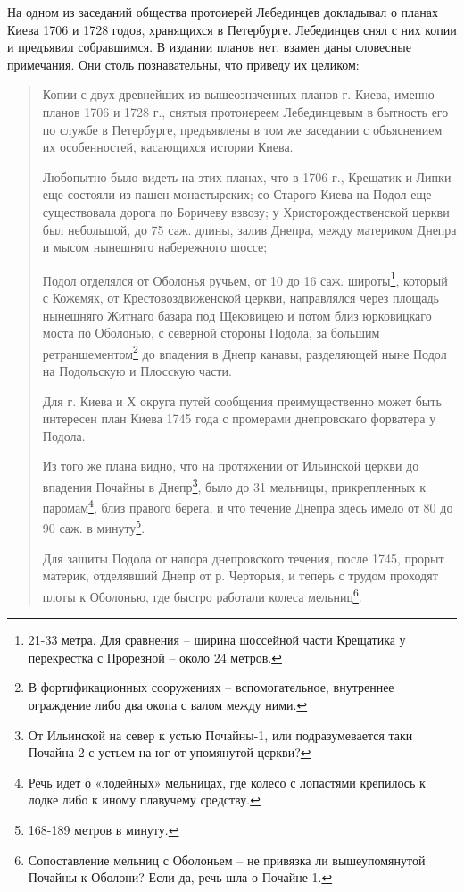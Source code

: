 На одном из заседаний общества протоиерей Лебединцев докладывал о планах Киева 1706 и 1728 годов, хранящихся в Петербурге. Лебединцев снял с них копии и предъявил собравшимся. В издании планов нет, взамен даны словесные примечания. Они столь познавательны, что приведу их целиком:

\begin{quotation}
Копии с двух древнейших из вышеозначенных планов г. Киева, именно планов 1706 и 1728 г., снятыя протоиереем Лебединцевым в бытность его по службе в Петербурге, предъявлены в том же заседании с объяснением их особенностей, касающихся истории Киева.

Любопытно было видеть на этих планах, что в 1706 г., Крещатик и Липки еще состояли из пашен монастырских; со Старого Киева на Подол еще существовала дорога по Боричеву взвозу; у Христорождественской церкви был небольшой, до 75 саж. длины, залив Днепра, между материком Днепра и мысом нынешняго набережного шоссе;

Подол отделялся от Оболонья ручьем, от 10 до 16 саж. широты\footnote{21-33 метра. Для сравнения – ширина шоссейной части Крещатика у перекрестка с Прорезной – около 24 метров.}, который с Кожемяк, от Крестовоздвиженской церкви, направлялся через площадь нынешняго Житнаго базара под Щековицею и потом близ юрковицкаго моста по Оболонью, с северной стороны Подола, за большим ретраншементом\footnote{В фортификационных сооружениях – вспомогательное, внутреннее ограждение либо два окопа с валом между ними.} до впадения в Днепр канавы, разделяющей ныне Подол на Подольскую и Плосскую части.

Для г. Киева и Х округа путей сообщения преимущественно может быть интересен план Киева 1745 года с промерами днепровскаго форватера у Подола. 

Из того же плана видно, что на протяжении от Ильинской церкви до впадения Почайны в Днепр\footnote{От Ильинской на север к устью Почайны-1, или подразумевается таки Почайна-2 с устьем на юг от упомянутой церкви?}, было до 31 мельницы, прикрепленных к паромам\footnote{Речь идет о «лодейных» мельницах, где колесо с лопастями крепилось к лодке либо к иному плавучему средству.}, близ правого берега, и что течение Днепра здесь имело от 80 до 90 саж. в минуту\footnote{168-189 метров в минуту.}. 

Для защиты Подола от напора днепровского течения, после 1745, прорыт материк, отделявший Днепр от р. Черторыя, и теперь с трудом проходят плоты к Оболонью, где быстро работали колеса мельниц\footnote{Сопоставление мельниц с Оболоньем – не привязка ли вышеупомянутой Почайны к Оболони? Если да, речь шла о Почайне-1.}.
\end{quotation}


